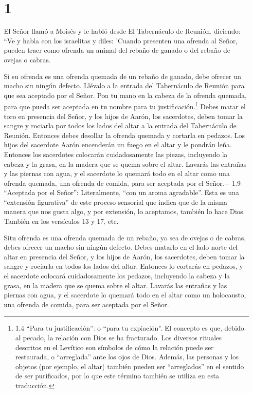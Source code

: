\hypertarget{section}{%
\section{1}\label{section}}

 El Señor llamó a Moisés y le habló desde El Tabernáculo de
Reunión, diciendo:  ``Ve y habla con los israelitas y diles:
'Cuando presenten una ofrenda al Señor, pueden traer como ofrenda un
animal del rebaño de ganado o del rebaño de ovejas o cabras.

 Si su ofrenda es una ofrenda quemada de un rebaño de
ganado, debe ofrecer un macho sin ningún defecto. Llévalo a la entrada
del Tabernáculo de Reunión para que sea aceptado por el Señor.
 Pon tu mano en la cabeza de la ofrenda quemada, para que
pueda ser aceptada en tu nombre para tu justificación.\footnote{1.4
  ``Para tu justificación'': o ``para tu expiación''. El concepto es
  que, debido al pecado, la relación con Dios se ha fracturado. Los
  diversos rituales descritos en el Levítico son símbolos de cómo la
  relación puede ser restaurada, o ``arreglada'' ante los ojos de Dios.
  Además, las personas y los objetos (por ejemplo, el altar) también
  pueden ser ``arreglados'' en el sentido de ser purificados, por lo que
  este término también se utiliza en esta traducción.} 
Debes matar el toro en presencia del Señor, y los hijos de Aarón, los
sacerdotes, deben tomar la sangre y rociarla por todos los lados del
altar a la entrada del Tabernáculo de Reunión.  Entonces
debes desollar la ofrenda quemada y cortarla en pedazos. 
Los hijos del sacerdote Aarón encenderán un fuego en el altar y le
pondrán leña.  Entonces los sacerdotes colocarán
cuidadosamente las piezas, incluyendo la cabeza y la grasa, en la madera
que se quema sobre el altar.  Lavarás las entrañas y las
piernas con agua, y el sacerdote lo quemará todo en el altar como una
ofrenda quemada, una ofrenda de comida, para ser aceptada por el Señor.+
1.9 ``Aceptada por el Señor'': Literalmente, ``con un aroma agradable''.
Esta es una ``extensión figurativa'' de este proceso sensorial que
indica que de la misma manera que nos gusta algo, y por extensión, lo
aceptamos, también lo hace Dios. También en los versículos 13 y 17, etc.

 Situ ofrenda es una ofrenda quemada de un rebaño, ya sea
de ovejas o de cabras, debes ofrecer un macho sin ningún defecto.
 Debes matarlo en el lado norte del altar en presencia del
Señor, y los hijos de Aarón, los sacerdotes, deben tomar la sangre y
rociarla en todos los lados del altar.  Entonces lo
cortarás en pedazos, y el sacerdote colocará cuidadosamente los pedazos,
incluyendo la cabeza y la grasa, en la madera que se quema sobre el
altar.  Lavarás las entrañas y las piernas con agua, y el
sacerdote lo quemará todo en el altar como un holocausto, una ofrenda de
comida, para ser aceptada por el Señor.

